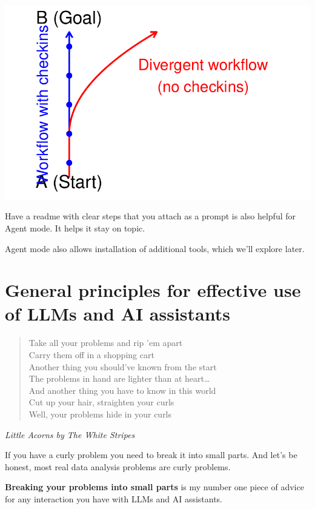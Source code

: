 \documentclass[
  letterpaper,
  DIV=11,
  numbers=noendperiod]{scrreprt}
\begin{document}
\includegraphics{07-advanced-llm-agents_files/figure-pdf/unnamed-chunk-1-1.pdf}

Have a readme with clear steps that you attach as a prompt is also
helpful for Agent mode. It helps it stay on topic.

Agent mode also allows installation of additional tools, which we'll
explore later.


\chapter{General principles for effective use of LLMs and AI
assistants}\label{general-principles-for-effective-use-of-llms-and-ai-assistants}

\begin{quote}
Take all your problems and rip 'em apart\\
Carry them off in a shopping cart\\
Another thing you should've known from the start\\
The problems in hand are lighter than at heart\ldots{}\\
And another thing you have to know in this world\\
Cut up your hair, straighten your curls\\
Well, your problems hide in your curls
\end{quote}

\emph{Little Acorns by The White Stripes}

If you have a curly problem you need to break it into small parts. And
let's be honest, most real data analysis problems are curly problems.

\textbf{Breaking your problems into small parts} is my number one piece
of advice for any interaction you have with LLMs and AI assistants.
\end{document}
